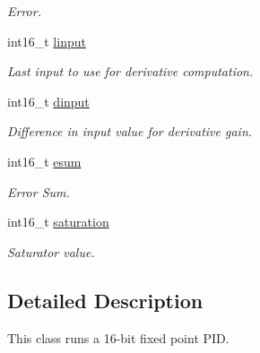 \begin{DoxyCompactItemize}
\begin{DoxyCompactList}\small\item\em Error. \end{DoxyCompactList}\item 
\hypertarget{classpid_a02fdd387695c12447f66cd9d3d5771cf}{int16\-\_\-t \hyperlink{classpid_a02fdd387695c12447f66cd9d3d5771cf}{linput}}\label{classpid_a02fdd387695c12447f66cd9d3d5771cf}

\begin{DoxyCompactList}\small\item\em Last input to use for derivative computation. \end{DoxyCompactList}\item 
\hypertarget{classpid_a3d8d755e11f71312873193173a67f4b4}{int16\-\_\-t \hyperlink{classpid_a3d8d755e11f71312873193173a67f4b4}{dinput}}\label{classpid_a3d8d755e11f71312873193173a67f4b4}

\begin{DoxyCompactList}\small\item\em Difference in input value for derivative gain. \end{DoxyCompactList}\item 
\hypertarget{classpid_ac261e7593e0e5f1ded5de243e87ade2b}{int16\-\_\-t \hyperlink{classpid_ac261e7593e0e5f1ded5de243e87ade2b}{esum}}\label{classpid_ac261e7593e0e5f1ded5de243e87ade2b}

\begin{DoxyCompactList}\small\item\em Error Sum. \end{DoxyCompactList}\item 
\hypertarget{classpid_aa3fbfe3ad49d8a00ccf7b20b5e596c56}{int16\-\_\-t \hyperlink{classpid_aa3fbfe3ad49d8a00ccf7b20b5e596c56}{saturation}}\label{classpid_aa3fbfe3ad49d8a00ccf7b20b5e596c56}

\begin{DoxyCompactList}\small\item\em Saturator value. \end{DoxyCompactList}\end{DoxyCompactItemize}


\subsection{Detailed Description}
This class runs a 16-\/bit fixed point P\-I\-D. 

